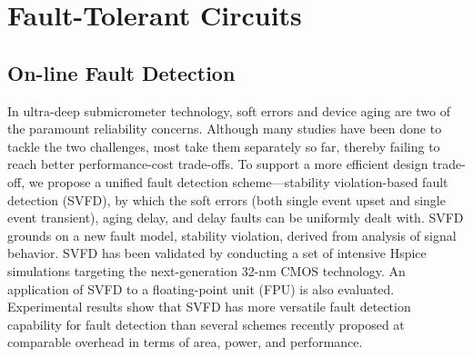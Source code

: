 %
%
%
\chapter{Fault-Tolerant Circuits}


\section{On-line Fault Detection}
In ultra-deep submicrometer technology, soft errors and device aging are two of the paramount reliability concerns. Although many studies have been done to tackle the two challenges, most take them separately so far, thereby failing to reach better performance-cost trade-offs. To support a more efficient design trade-off, we propose a unified fault detection scheme—stability violation-based fault detection (SVFD), by which the soft errors (both single event upset and single event transient), aging delay, and delay faults can be uniformly dealt with. SVFD grounds on a new fault model, stability violation, derived from analysis of signal behavior. SVFD has been validated by conducting a set of intensive Hspice simulations targeting the next-generation 32-nm CMOS technology. An application of SVFD to a floating-point unit (FPU) is also evaluated. Experimental results show that SVFD has more versatile fault detection capability for fault detection than several schemes recently proposed at comparable overhead in terms of area, power, and performance. 

